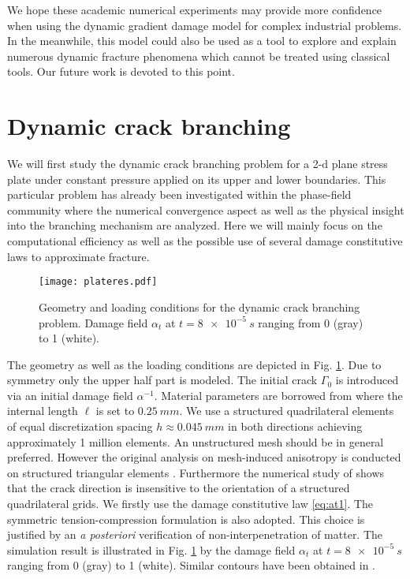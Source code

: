 We hope these academic numerical experiments may provide more confidence when using the dynamic gradient damage model for complex industrial problems. In the meanwhile, this model could also be used as a tool to explore and explain numerous dynamic fracture phenomena which cannot be treated using classical tools. Our future work is devoted to this point.

\section{Dynamic crack branching}
We will first study the dynamic crack branching problem for a 2-d plane stress plate under constant pressure applied on its upper and lower boundaries. This particular problem has already been investigated within the phase-field community \cite{BordenVerhooselScottHughesLandis:2012,SchlueterWillenbuecherKuhnMueller:2014} where the numerical convergence aspect as well as the physical insight into the branching mechanism are analyzed. Here we will mainly focus on the computational efficiency as well as the possible use of several damage constitutive laws to approximate fracture.
\begin{figure}[htbp]
\centering
\texttt{[image: plateres.pdf]}
\caption{Geometry and loading conditions for the dynamic crack branching problem. Damage field $\alpha_t$ at $t=\SI{8e-5}{s}$ ranging from 0 (gray) to 1 (white).} \label{fig:branching}
\end{figure}

The geometry as well as the loading conditions are depicted in Fig. \ref{fig:branching}. Due to symmetry only the upper half part is modeled. The initial crack $\Gamma_0$ is introduced via an initial damage field $\alpha^{-1}$. Material parameters are borrowed from \cite{BordenVerhooselScottHughesLandis:2012} where the internal length $\ell$ is set to $\SI{0.25}{mm}$. We use a structured quadrilateral elements of equal discretization spacing $h\approx\SI{0.045}{mm}$ in both directions achieving approximately 1 million elements. An unstructured mesh should be in general preferred. However the original analysis on mesh-induced anisotropy is conducted on structured triangular elements \cite{Negri:1999}. Furthermore the numerical study of \cite{LorentzGodard:2011} shows that the crack direction is insensitive to the orientation of a structured quadrilateral grids. We firstly use the damage constitutive law \eqref{eq:at1}. The symmetric tension-compression formulation is also adopted. This choice is justified by an \emph{a posteriori} verification of non-interpenetration of matter. The simulation result is illustrated in Fig. \ref{fig:branching} by the damage field $\alpha_t$ at $t=\SI{8e-5}{s}$ ranging from 0 (gray) to 1 (white). Similar contours have been obtained in \cite{BordenVerhooselScottHughesLandis:2012,SchlueterWillenbuecherKuhnMueller:2014}.

